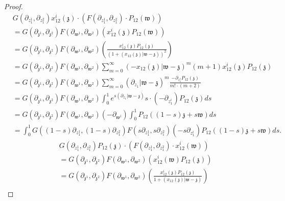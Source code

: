 \documentclass[11pt]{amsart}
\theoremstyle{definition}
\theoremstyle{remark}
\numberwithin{equation}{section}
\begin{document}
\begin{proof}
  \begin{align*}
&      G(\partial_{z^1_{1}},\partial_{z^2_{1}})x^i_{12}(\mathfrak{z})\cdot\left( F(\partial_{z^1_{1}},\partial_{z^2_{1}})\cdot P_{12}(\mathfrak{w})\right)  \\ &=G(\partial_{\mathfrak{z}^1},\partial_{\mathfrak{z}^2})F(\partial_{\mathfrak{w}^1},\partial_{\mathfrak{w}^2})\left(x^i_{12}(\mathfrak{z})P_{12}(\mathfrak{w})\right)\\
     & =G(\partial_{\mathfrak{z}^1},\partial_{\mathfrak{z}^2})F(\partial_{\mathfrak{w}^1},\partial_{\mathfrak{w}^2})\left(\frac{x^i_{12}(\mathfrak{z})P_{12}(\mathfrak{z})}{\left(1+(x_{12}(\mathfrak{z})|\mathfrak{w}-\mathfrak{z})\right)^2}\right)\\
    &=  G(\partial_{\mathfrak{z}^1},\partial_{\mathfrak{z}^2})F(\partial_{\mathfrak{w}^1},\partial_{\mathfrak{w}^2})  \sum_{m=0}^{\infty}(-x_{12}(\mathfrak{z})|\mathfrak{w}-\mathfrak{z})^m(m+1)x^i_{12}(\mathfrak{z})P_{12}(\mathfrak{z}) \\
    &=G(\partial_{\mathfrak{z}^1},\partial_{\mathfrak{z}^2})F(\partial_{\mathfrak{w}^1},\partial_{\mathfrak{w}^2}) \sum_{m=0}^{\infty}(\partial_{z_1}|\mathfrak{w}-\mathfrak{z})^m\frac{-\partial_{z^1_1}P_{12}(\mathfrak{z})}{m!\cdot (m+2)}\\
    &=G(\partial_{\mathfrak{z}^1},\partial_{\mathfrak{z}^2})F(\partial_{\mathfrak{w}^1},\partial_{\mathfrak{w}^2}) \int^1_0e^{s(\partial_{z_1}|\mathfrak{w}-\mathfrak{z})}s\cdot (-\partial_{z^{i}_1})P_{12}(\mathfrak{z})ds\\
    &=G(\partial_{\mathfrak{z}^1},\partial_{\mathfrak{z}^2})F(\partial_{\mathfrak{w}^1},\partial_{\mathfrak{w}^2})(-\partial_{\mathfrak{w}^i})\int^1_0P_{12}\left((1-s)\mathfrak{z}+s\mathfrak{w}\right)ds\\
    &=\int^1_0G\left((1-s)\partial_{z^1_1},(1-s)\partial_{z^2_1}\right)F\left(s\partial_{z^1_1},s\partial_{z^2_1}\right)(-s\partial_{z^i_1})P_{12}\left((1-s)\mathfrak{z}+s\mathfrak{w}\right)ds.
  \end{align*}
\iffalse
  \begin{align*}
     & G(\partial_{z^1_{1}},\partial_{z^2_{1}})P_{12}(\mathfrak{z})\cdot\left( F(\partial_{z^1_{1}},\partial_{z^2_{1}})\cdot x^i_{12}(\mathfrak{w})\right)  \\ &=G(\partial_{\mathfrak{z}^1},\partial_{\mathfrak{z}^2})F(\partial_{\mathfrak{w}^1},\partial_{\mathfrak{w}^2})\left(x^i_{12}(\mathfrak{w})P_{12}(\mathfrak{z})\right)\\
     & =G(\partial_{\mathfrak{z}^1},\partial_{\mathfrak{z}^2})F(\partial_{\mathfrak{w}^1},\partial_{\mathfrak{w}^2})\left(\frac{x^i_{12}(\mathfrak{z})P_{12}(\mathfrak{z})}{1+(x_{12}(\mathfrak{z})|\mathfrak{w}-\mathfrak{z})}\right)\\

\end{align*}
\end{proof}
\end{document}
